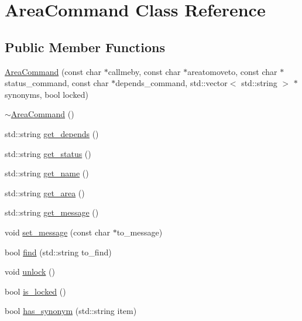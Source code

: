 \hypertarget{class_area_command}{
\section{\-Area\-Command \-Class \-Reference}
\label{class_area_command}
}
\subsection*{\-Public \-Member \-Functions}
\begin{DoxyCompactItemize}
\item 
\hyperlink{class_area_command_a638e3a777d9c8e3810212835b979eff0}{\-Area\-Command} (const char $\ast$callmeby, const char $\ast$areatomoveto, const char $\ast$status\-\_\-command, const char $\ast$depends\-\_\-command, std\-::vector$<$ std\-::string $>$ $\ast$synonyms, bool locked)
\item 
\hyperlink{class_area_command_aa978468c6b9bcc165d70437273623950}{$\sim$\-Area\-Command} ()
\item 
std\-::string \hyperlink{class_area_command_a7c24cd88b6913494bfed3b6f6b0fe7f6}{get\-\_\-depends} ()
\item 
std\-::string \hyperlink{class_area_command_adc3423bc66eba73317cd941632026b85}{get\-\_\-status} ()
\item 
std\-::string \hyperlink{class_area_command_ad61a6fb1db17d07a2e214c7c2267581d}{get\-\_\-name} ()
\item 
std\-::string \hyperlink{class_area_command_a9f558f5ce36040a51401924af9781402}{get\-\_\-area} ()
\item 
std\-::string \hyperlink{class_area_command_a594ec5125fc0467ee001064ff73a1632}{get\-\_\-message} ()
\item 
void \hyperlink{class_area_command_a1a081291614ee6ff8c5841d2753b3b1b}{set\-\_\-message} (const char $\ast$to\-\_\-message)
\item 
bool \hyperlink{class_area_command_a317a22131f031bbc4f364b1199261829}{find} (std\-::string to\-\_\-find)
\item 
void \hyperlink{class_area_command_a0a5c63d57a821d2f3d833e7a826afa4a}{unlock} ()
\item 
bool \hyperlink{class_area_command_a34eba7b250e50210e2da7faf07754ff6}{is\-\_\-locked} ()
\item 
bool \hyperlink{class_area_command_ab5fef6aab4c7efd6767eacafc1994e96}{has\-\_\-synonym} (std\-::string item)
\end{DoxyCompactItemize}
